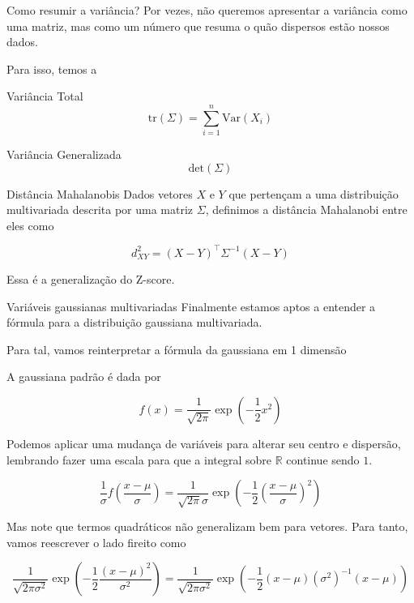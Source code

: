 \documentclass[
  ignorenonframetext,
  aspectratio=169,
]{beamer}
\begin{document}
\begin{frame}{Como resumir a variância?}
Por vezes, não queremos apresentar a variância como uma matriz, mas como
um número que resuma o quão dispersos estão nossos dados.

Para isso, temos a

\begin{block}{Variância Total}
\[\text{tr}(\Sigma) = \sum_{i=1}^n \text{Var}(X_i)\]
\end{block}

\begin{block}{Variância Generalizada}
\[\text{det}(\Sigma)\]
\end{block}
\end{frame}

\begin{frame}{Distância Mahalanobis}
Dados vetores \(X\) e \(Y\) que pertençam a uma distribuição
multivariada descrita por uma matriz \(\Sigma\), definimos a distância
Mahalanobi entre eles como

\[d_{XY}^2 = (X-Y)^\top\Sigma^{-1}(X-Y)\]

Essa é a generalização do Z-score.
\end{frame}

\begin{frame}{Variáveis gaussianas multivariadas}
Finalmente estamos aptos a entender a fórmula para a distribuição
gaussiana multivariada.

Para tal, vamos reinterpretar a fórmula da gaussiana em 1 dimensão
\end{frame}

\begin{frame}
A gaussiana padrão é dada por

\[f(x) = \frac{1}{\sqrt{2\pi}}\exp\left(-\frac{1}{2}x^2\right)\]
\end{frame}

\begin{frame}
Podemos aplicar uma mudança de variáveis para alterar seu centro e
dispersão, lembrando fazer uma escala para que a integral sobre
\(\mathbb
{R}\) continue sendo \(1\).

\[\frac{1}{\sigma}f\left(\frac{x-\mu}{\sigma}\right) = \frac{1}{\sqrt{2\pi}\sigma}\exp\left(-\frac{1}{2}\left(\frac{x-\mu}{\sigma}\right)^2\right)\]
\end{frame}

\begin{frame}
Mas note que termos quadráticos não generalizam bem para vetores. Para
tanto, vamos reescrever o lado fireito como

\[\frac{1}{\sqrt{2\pi\sigma^2}}\exp\left(-\frac{1}{2}\frac{(x-\mu)^2}{\sigma^2}\right) = \frac{1}{\sqrt{2\pi\sigma^2}}\exp\left(-\frac{1}{2}(x-\mu)(\sigma^2)^{-1}(x-\mu)\right) \]
\end{frame}
\end{document}
